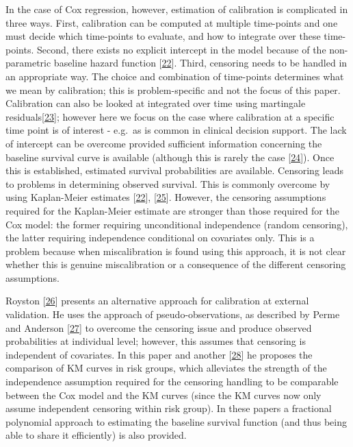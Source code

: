 \documentclass[12pt,PhD,twoside,openright]{muthesis}
\begin{document}
In the case of Cox regression, however, estimation of calibration is complicated in three ways. First, calibration can be computed at multiple time-points and one must decide which time-points to evaluate, and how to integrate over these time-points. Second, there exists no explicit intercept in the model because of the non-parametric baseline hazard function {[}\protect\hyperlink{ref-royston_external_2013}{22}{]}. Third, censoring needs to be handled in an appropriate way. The choice and combination of time-points determines what we mean by calibration; this is problem-specific and not the focus of this paper. Calibration can also be looked at integrated over time using martingale residuals{[}\protect\hyperlink{ref-crowson_assessing_2016}{23}{]}; however here we focus on the case where calibration at a specific time point is of interest - e.g.~as is common in clinical decision support. The lack of intercept can be overcome provided sufficient information concerning the baseline survival curve is available (although this is rarely the case {[}\protect\hyperlink{ref-houwelingen_validation_2000}{24}{]}). Once this is established, estimated survival probabilities are available. Censoring leads to problems in determining observed survival. This is commonly overcome by using Kaplan-Meier estimates {[}\protect\hyperlink{ref-royston_external_2013}{22}{]}, {[}\protect\hyperlink{ref-hippisley-cox_derivation_2007}{25}{]}. However, the censoring assumptions required for the Kaplan-Meier estimate are stronger than those required for the Cox model: the former requiring unconditional independence (random censoring), the latter requiring independence conditional on covariates only. This is a problem because when miscalibration is found using this approach, it is not clear whether this is genuine miscalibration or a consequence of the different censoring assumptions.

Royston {[}\protect\hyperlink{ref-royston_tools_2014}{26}{]} presents an alternative approach for calibration at external validation. He uses the approach of pseudo-observations, as described by Perme and Anderson {[}\protect\hyperlink{ref-perme_checking_2008}{27}{]} to overcome the censoring issue and produce observed probabilities at individual level; however, this assumes that censoring is independent of covariates. In this paper and another {[}\protect\hyperlink{ref-royston_tools_2015}{28}{]} he proposes the comparison of KM curves in risk groups, which alleviates the strength of the independence assumption required for the censoring handling to be comparable between the Cox model and the KM curves (since the KM curves now only assume independent censoring within risk group). In these papers a fractional polynomial approach to estimating the baseline survival function (and thus being able to share it efficiently) is also provided.
\end{document}
